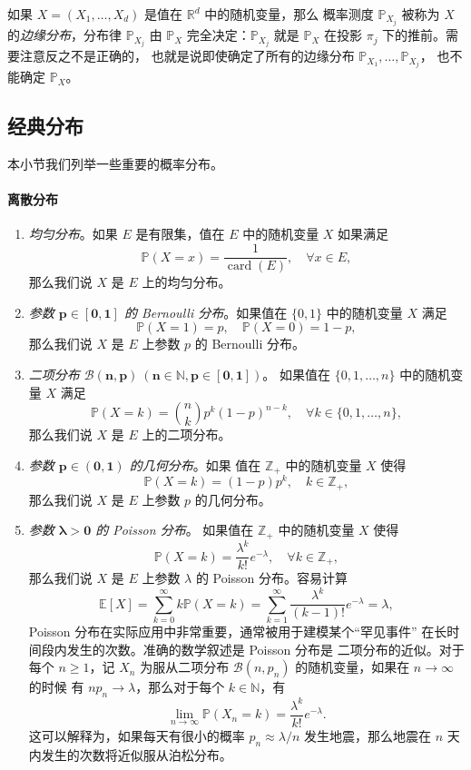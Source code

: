\documentclass[fontset=none]{Notes}
\DeclareMathOperator\card{card}
\begin{document}
如果 $X=(X_1,\dots,X_d)$ 是值在 $\mathbb{R}^d$ 中的随机变量，那么
概率测度 $\mathbb{P}_{X_j}$ 被称为 $X$ 的\emph{边缘分布}，分布律
$\mathbb{P}_{X_j}$ 由 $\mathbb{P}_X$ 完全决定：$\mathbb{P}_{X_j}$
就是 $\mathbb{P}_X$ 在投影 $\pi_j$ 下的推前。需要注意反之不是正确的，
也就是说即使确定了所有的边缘分布 $\mathbb{P}_{X_1},\dots,\mathbb{P}_{X_j}$，
也不能确定 $\mathbb{P}_X$。
 

\subsection{经典分布}

本小节我们列举一些重要的概率分布。

\paragraph{离散分布}
\begin{enumerate}
  \item \emph{均匀分布}。如果 $E$ 是有限集，值在 $E$ 中的随机变量
  $X$ 如果满足
  \[
    \mathbb{P}(X=x)=\frac{1}{\card(E)},\quad \forall x\in E,  
  \]
  那么我们说 $X$ 是 $E$ 上的均匀分布。
  \item \emph{参数 $\mathbold{p\in[0,1]}$ 的 Bernoulli 分布}。如果值在
  $\{0,1\}$ 中的随机变量 $X$ 满足
  \[
    \mathbb{P}(X=1)=p,\quad \mathbb{P}(X=0)=1-p,  
  \]
  那么我们说 $X$ 是 $E$ 上参数 $p$ 的 Bernoulli 分布。
  \item \emph{二项分布 $\mathbold{\mathcal{B}(n,p)\ (n\in \mathbb{N},p\in[0,1])}$}。
  如果值在 $\{0,1,\dots,n\}$ 中的随机变量 $X$ 满足
  \[
    \mathbb{P}(X=k)=\binom{n}{k}p^k(1-p)^{n-k} ,\quad \forall k\in\{0,1,\dots,n\} ,
  \]
  那么我们说 $X$ 是 $E$ 上的二项分布。
  \item \emph{参数 $\mathbold{p\in(0,1)}$ 的几何分布}。如果
  值在 $\mathbb{Z}_+$ 中的随机变量 $X$ 使得
  \[
    \mathbb{P}(X=k)=(1-p)p^k  ,\quad k\in \mathbb{Z}_+,
  \]
  那么我们说 $X$ 是 $E$ 上参数 $p$ 的几何分布。
  \item \emph{参数 $\mathbold{\lambda>0}$ 的 Poisson 分布}。
  如果值在 $\mathbb{Z}_+$ 中的随机变量 $X$ 使得
  \[
    \mathbb{P}(X=k)=\frac{\lambda^k}{k!}e^{-\lambda},\quad\forall k\in \mathbb{Z}_+,  
  \]
  那么我们说 $X$ 是 $E$ 上参数 $\lambda$ 的 Poisson 分布。容易计算
  \[
    \mathbb{E}[X]=\sum_{k=0}^\infty k \mathbb{P}(X=k)=
    \sum_{k=1}  ^\infty \frac{\lambda^k}{(k-1)!}e^{-\lambda}=\lambda,
  \]
  Poisson 分布在实际应用中非常重要，通常被用于建模某个“罕见事件”
  在长时间段内发生的次数。准确的数学叙述是 Poisson 分布是
  二项分布的近似。对于每个 $n\geq 1$，记 $X_n$ 为服从二项分布
  $\mathcal{B}(n,p_n)$ 的随机变量，如果在 $n\to\infty$ 的时候
  有 $np_n\to\lambda$，那么对于每个 $k\in \mathbb{N}$，有
  \[
    \lim_{n\to\infty} \mathbb{P}(X_n=k)=
    \frac{\lambda^k}{k!}e^{-\lambda}.
  \]
  这可以解释为，如果每天有很小的概率 $p_n\approx\lambda/n$
  发生地震，那么地震在 $n$ 天内发生的次数将近似服从泊松分布。
\end{enumerate}
\end{document}
